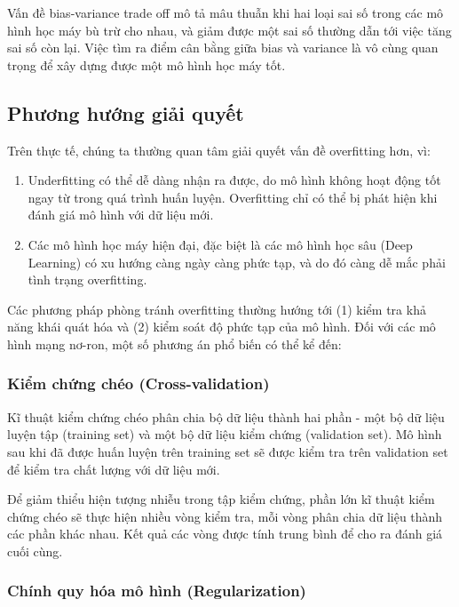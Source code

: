 \documentclass[12pt]{extreport}
\begin{document}
Vấn đề bias-variance trade off mô tả mâu thuẫn khi hai loại sai số trong các mô hình học máy bù trừ cho nhau, và giảm được một sai số thường dẫn tới việc tăng sai số còn lại. Việc tìm ra điểm cân bằng giữa bias và variance là vô cùng quan trọng để xây dựng được một mô hình học máy tốt.

\subsection{Phương hướng giải quyết}

Trên thực tế, chúng ta thường quan tâm giải quyết vấn đề overfitting hơn, vì:
\begin{enumerate}
    \item Underfitting có thể dễ dàng nhận ra được, do mô hình không hoạt động tốt ngay từ trong quá trình huấn luyện. Overfitting chỉ có thể bị phát hiện khi đánh giá mô hình với dữ liệu mới.
    \item Các mô hình học máy hiện đại, đặc biệt là các mô hình học sâu (Deep Learning) có xu hướng càng ngày càng phức tạp, và do đó càng dễ mắc phải tình trạng overfitting.
\end{enumerate}

Các phương pháp phòng tránh overfitting thường hướng tới (1) kiểm tra khả năng khái quát hóa và (2) kiểm soát độ phức tạp của mô hình. Đối với các mô hình mạng nơ-ron, một số phương án phổ biến có thể kể đến:

\subsubsection{Kiểm chứng chéo (Cross-validation)}

Kĩ thuật kiểm chứng chéo phân chia bộ dữ liệu thành hai phần - một bộ dữ liệu luyện tập (training set) và một bộ dữ liệu kiểm chứng (validation set). Mô hình sau khi đã được huấn luyện trên training set sẽ được kiểm tra trên validation set để kiểm tra chất lượng với dữ liệu mới.

Để giảm thiểu hiện tượng nhiễu trong tập kiểm chứng, phần lớn kĩ thuật kiểm chứng chéo sẽ thực hiện nhiều vòng kiểm tra, mỗi vòng phân chia dữ liệu thành các phần khác nhau. Kết quả các vòng được tính trung bình để cho ra đánh giá cuối cùng.

\subsubsection{Chính quy hóa mô hình (Regularization)}
\end{document}
